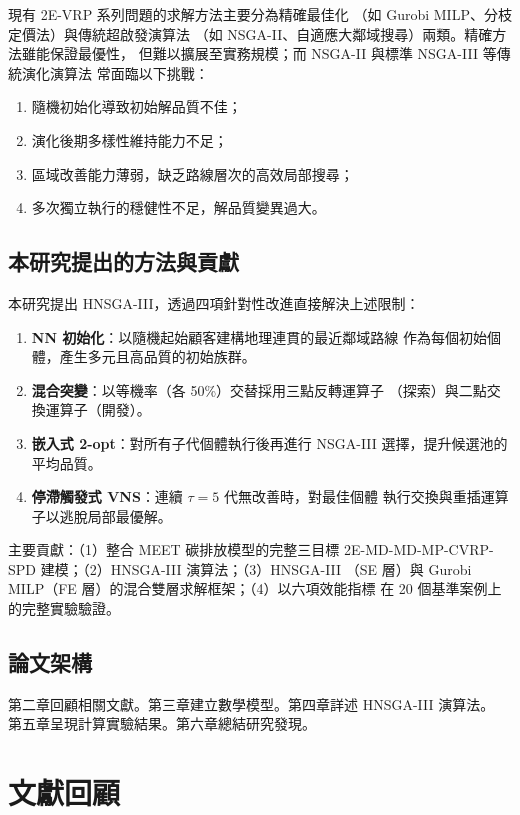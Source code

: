 \documentclass[11pt, a4paper]{article}
\numberwithin{equation}{section}
\begin{document}
現有 2E-VRP 系列問題的求解方法主要分為精確最佳化
（如 Gurobi MILP、分枝定價法）與傳統超啟發演算法
（如 NSGA-II、自適應大鄰域搜尋）兩類。精確方法雖能保證最優性，
但難以擴展至實務規模；而 NSGA-II 與標準 NSGA-III 等傳統演化演算法
常面臨以下挑戰：
\begin{enumerate}[label=（\roman*）]
  \item 隨機初始化導致初始解品質不佳；
  \item 演化後期多樣性維持能力不足；
  \item 區域改善能力薄弱，缺乏路線層次的高效局部搜尋；
  \item 多次獨立執行的穩健性不足，解品質變異過大。
\end{enumerate}

\subsection{本研究提出的方法與貢獻}

本研究提出 HNSGA-III，透過四項針對性改進直接解決上述限制：
\begin{enumerate}
  \item \textbf{NN 初始化}：以隨機起始顧客建構地理連貫的最近鄰域路線
        作為每個初始個體，產生多元且高品質的初始族群。
  \item \textbf{混合突變}：以等機率（各 50\%）交替採用三點反轉運算子
        （探索）與二點交換運算子（開發）。
  \item \textbf{嵌入式 2-opt}：對所有子代個體執行後再進行 NSGA-III
        選擇，提升候選池的平均品質。
  \item \textbf{停滯觸發式 VNS}：連續 $\tau=5$ 代無改善時，對最佳個體
        執行交換與重插運算子以逃脫局部最優解。
\end{enumerate}

主要貢獻：（1）整合 MEET 碳排放模型的完整三目標
2E-MD-MD-MP-CVRP-SPD 建模；（2）HNSGA-III 演算法；（3）HNSGA-III
（SE 層）與 Gurobi MILP（FE 層）的混合雙層求解框架；（4）以六項效能指標
在 20 個基準案例上的完整實驗驗證。

\subsection{論文架構}

第二章回顧相關文獻。第三章建立數學模型。第四章詳述 HNSGA-III 演算法。
第五章呈現計算實驗結果。第六章總結研究發現。

\section{文獻回顧}
\label{sec:lit}
\end{document}
